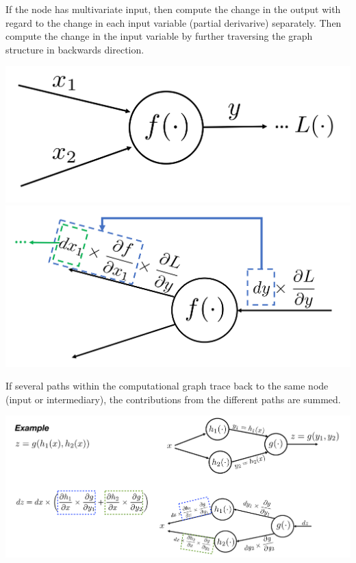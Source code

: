 \documentclass[11pt]{article}
\begin{document}
\noindent
\begin{minipage}{0.6\linewidth}
	If the node has multivariate input, then compute the change in the output with regard to the change in each input variable (partial derivarive) separately. Then compute the change in the input variable by further traversing the graph structure in backwards direction.
\end{minipage}
\begin{minipage}{0.4\linewidth}
	\centering
	\includegraphics[width=\linewidth]{img/backprop_contrib_node_multivariate}
	\includegraphics[width=\linewidth]{img/backprop_contrib_node_multivariate2}
\end{minipage}

\noindent
If several paths within the computational graph trace back to the same node (input or intermediary), the contributions from the different paths are summed.

\begin{center}
	\includegraphics[width=0.8\linewidth]{img/backprop_contrib_node_sum}
\end{center}
\end{document}
